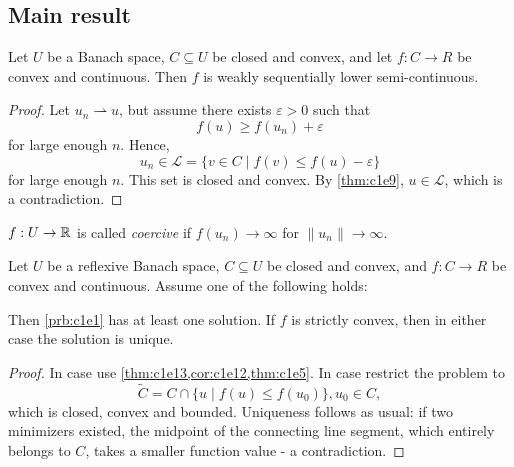 \documentclass[../skript.tex]{subfiles}
\begin{document}
\subsection{Main result}
\begin{lemma} %
\label{thm:c1e13}
Let $U$ be a Banach space, $C \subseteq U$ be closed and convex, and let $f : C \to R$ be convex and continuous.
Then $f$ is weakly sequentially lower semi-continuous.
\end{lemma}
\begin{proof}
Let $u_n \rightharpoonup u$, but assume there exists $\varepsilon > 0$ such that
\[
	f(u) \geq f(u_n) + \varepsilon
\]
for large enough $n$.
Hence,
\[
	u_n \in \mathcal{L} = \{ v \in C \mid f(v) \leq f(u) - \varepsilon \}
\]
for large enough $n$.
This set is closed and convex.
By \cref{thm:c1e9}, $u \in \mathcal{L}$, which is a contradiction.
\end{proof}
\begin{definition} %
$f : U \to \mathbb{R}$ is called \emph{coercive} if $f(u_n) \to \infty$ for $\| u_n \| \to \infty$.
\end{definition}
\begin{theorem} %
\label{thm:c1e14}
Let $U$ be a reflexive Banach space, $C \subseteq U$ be closed and convex, and $f : C \to R$ be convex and continuous. Assume one of the following holds:
Then \cref{prb:c1e1} has at least one solution. If $f$ is strictly convex, then in either case the solution is unique.
\end{theorem}
\begin{proof}
In case  use \cref{thm:c1e13,cor:c1e12,thm:c1e5}. In case  restrict the problem to
\[
	\tilde{C} = C \cap \{ u \mid f(u) \leq f(u_0) \}, u_0 \in C,
\]
which is closed, convex and bounded.
Uniqueness follows as usual: if two minimizers existed, the midpoint of the connecting line segment, which entirely belongs to $C$, takes a smaller function value - a contradiction.
\end{proof}
\end{document}
